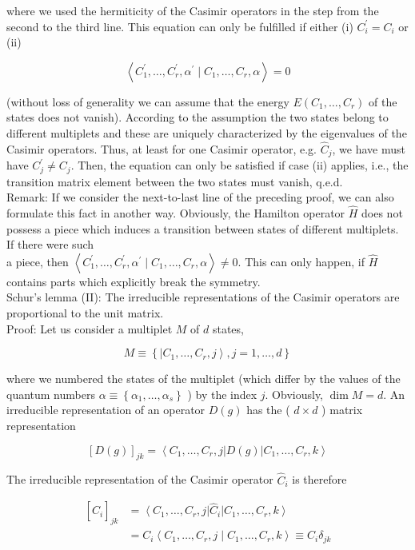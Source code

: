 \documentclass[10pt, letterpaper]{article}
\begin{document}
where we used the hermiticity of the Casimir operators in the step from the second to the third line. This equation can only be fulfilled if either (i) $C_{i}^{\prime}=C_{i}$ or (ii)

$$
\left\langle C_{1}^{\prime}, \ldots, C_{r}^{\prime}, \alpha^{\prime} \mid C_{1}, \ldots, C_{r}, \alpha\right\rangle=0
$$

(without loss of generality we can assume that the energy $E\left(C_{1}, \ldots, C_{r}\right)$ of the states does not vanish). According to the assumption the two states belong to different multiplets and these are uniquely characterized by the eigenvalues of the Casimir operators. Thus, at least for one Casimir operator, e.g. $\hat{C}_{j}$, we have must have $C_{j}^{\prime} \neq C_{j}$. Then, the equation can only be satisfied if case (ii) applies, i.e., the transition matrix element between the two states must vanish, q.e.d.\\
Remark: If we consider the next-to-last line of the preceding proof, we can also formulate this fact in another way. Obviously, the Hamilton operator $\hat{H}$ does not possess a piece which induces a transition between states of different multiplets. If there were such\\
a piece, then $\left\langle C_{1}^{\prime}, \ldots, C_{r}^{\prime}, \alpha^{\prime} \mid C_{1}, \ldots, C_{r}, \alpha\right\rangle \neq 0$. This can only happen, if $\hat{H}$ contains parts which explicitly break the symmetry.\\
Schur's lemma (II): The irreducible representations of the Casimir operators are proportional to the unit matrix.\\
Proof: Let us consider a multiplet $M$ of $d$ states,

$$
M \equiv\left\{\left|C_{1}, \ldots, C_{r}, j\right\rangle, j=1, \ldots, d\right\}
$$

where we numbered the states of the multiplet (which differ by the values of the quantum numbers $\alpha \equiv\left\{\alpha_{1}, \ldots, \alpha_{s}\right\}$ ) by the index $j$. Obviously, $\operatorname{dim} M=d$. An irreducible representation of an operator $D(g)$ has the ( $d \times d$ ) matrix representation

$$
[D(g)]_{j k}=\left\langle C_{1}, \ldots, C_{r}, j\right| D(g)\left|C_{1}, \ldots, C_{r}, k\right\rangle
$$

The irreducible representation of the Casimir operator $\hat{C}_{i}$ is therefore

$$
\begin{aligned}
{\left[\hat{C}_{i}\right]_{j k} } & =\left\langle C_{1}, \ldots, C_{r}, j\right| \hat{C}_{i}\left|C_{1}, \ldots, C_{r}, k\right\rangle \\
& =C_{i}\left\langle C_{1}, \ldots, C_{r}, j \mid C_{1}, \ldots, C_{r}, k\right\rangle \equiv C_{i} \delta_{j k}
\end{aligned}
$$
\end{document}
